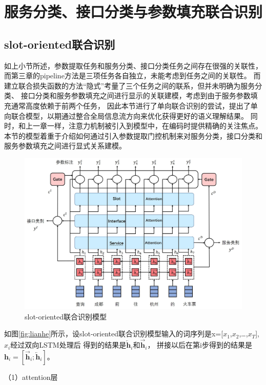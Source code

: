 \section{服务分类、接口分类与参数填充联合识别}
\subsection{slot-oriented联合识别}
如上小节所述，参数提取任务和服务分类、接口分类任务之间存在很强的关联性，而第三章的pipeline方法是三项任务各自独立，未能考虑到任务之间的关联性。
而建立联合损失函数的方法“隐式”考量了三个任务之间的联系，但并未明确为服务分类、
接口分类和服务参数填充之间进行显示的关联建模，考虑到由于服务参数填充通常高度依赖于前两个任务，
因此本节进行了单向联合识别的尝试，提出了单向联合模型，以期通过整合全局信息流方向来优化获得更好的语义理解结果。
同时，和上一章一样，注意力机制被引入到模型中，在编码时提供精确的关注焦点。
本节的模型着重于介绍如何通过引入参数提取门控机制来对服务分类，接口分类和服务参数填充之间进行显式关系建模。

\begin{figure}[htbp]
    \centering
    \includegraphics[width=17cm]{./images/lianhe.jpg}
    \caption{slot-oriented联合识别模型}
    \label{fig:lianhe1}
  \end{figure}

如图\ref{fig:lianhe}所示，设slot-oriented联合识别模型输入的词序列是x=[$x_{1}$,$x_{2}$,\dots,$x_{T}$],$x_{i}$经过双向LSTM处理后
得到的结果是$\overleftarrow{\mathbf{h}}_{i}$和$\overrightarrow{\mathbf{h}}_{i}$，
拼接以后在第i步得到的结果是$\mathbf{h}_{i}=[\overrightarrow{\mathbf{h}}_{i} ;\overleftarrow{\mathbf{h}}_{i}]$。

（1）attention层

